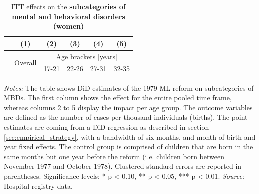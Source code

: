 \documentclass[11pt, a4paper, draft]{article} %
\begin{document}
\newpage
{} 
\vspace*{\fill}
\begin{table}[H] \centering 
	\begin{threeparttable} \centering \caption{ITT effects on the \textbf{subcategories of mental and behavioral disorders (women)}}\label{tab: ITT_across_d5subcategories_per_age_group_women}
		{\def\sym#1{\ifmmode^{#1}\else\(^{#1}\)\fi} 
			\begin{tabular}{l*{5}{c}}
				\toprule 
				&\multicolumn{1}{c}{(1)}&\multicolumn{1}{c}{(2)}&\multicolumn{1}{c}{(3)}&\multicolumn{1}{c}{(4)}&\multicolumn{1}{c}{(5)}\\
				\midrule
				&\multirow{2}{*}{Overall} & \multicolumn{4}{c}{Age brackets [years]} \\ 
				\cmidrule(lr){3-6}
				&&\multicolumn{1}{c}{17-21}&\multicolumn{1}{c}{22-26}&\multicolumn{1}{c}{27-31}&\multicolumn{1}{c}{32-35}\\
				
				\midrule
				
				
				
				\bottomrule 
		\end{tabular}}
	\end{threeparttable} 
	\begin{minipage}{0.9\linewidth}
		\scriptsize \emph{Notes:} The table shows DiD estimates of the 1979 ML reform on subcategories of MBDs. The first column shows the effect for the entire pooled time frame, whereas columns 2 to 5 display the impact per age group. The outcome variables are defined as the number of cases per thousand individuals (births). The point estimates are coming from a DiD regression as described in section \ref{sec:empirical_strategy}, with a bandwidth of six months, and month-of-birth and year fixed effects. The control group is comprised of children that are born in the same months but one year before the reform (i.e. children born between November 1977 and October 1978). Clustered standard errors are reported in parentheses. \newline Significance levels: * p < 0.10, ** p < 0.05, *** p < 0.01. \newline 	\emph{Source:} Hospital registry data.
	\end{minipage}
\end{table} 
\vspace*{\fill}\clearpage 
\restoregeometry
\end{document}
